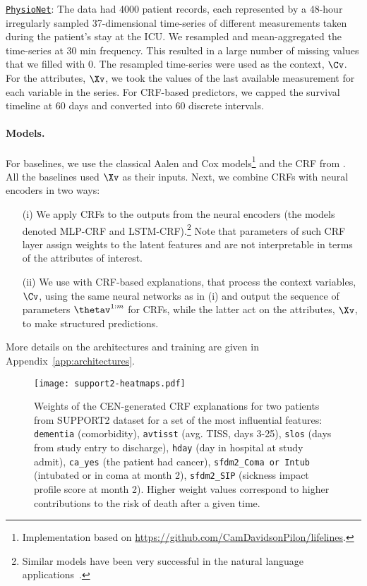 \documentclass[twoside,11pt]{article}
\begin{document}
\underline{\texttt{PhysioNet}}:
The data had 4000 patient records, each represented by a 48-hour irregularly sampled 37-dimensional time-series of different measurements taken during the patient's stay at the ICU.
We resampled and mean-aggregated the time-series at 30 min frequency.
This resulted in a large number of missing values that we filled with 0.
The resampled time-series were used as the context, $\Cv$.
For the attributes, $\Xv$, we took the values of the last available measurement for each variable in the series.
For CRF-based predictors, we capped the survival timeline at 60 days and converted into 60 discrete intervals.

\paragraph{Models.}
For baselines, we use the classical Aalen and Cox models\footnote{Implementation based on \url{https://github.com/CamDavidsonPilon/lifelines}.} and the CRF from \citep{lin2011learning}.
All the baselines used $\Xv$ as their inputs.
Next, we combine CRFs with neural encoders in two ways:
\begin{itemize}[noitemsep,topsep=2pt,parsep=2pt,leftmargin=2em]
    \item[(i)] We apply CRFs to the outputs from the neural encoders (the models denoted MLP-CRF and LSTM-CRF).\footnote{Similar models have been very successful in the natural language applications~\citep{collobert2011natural}.}
    Note that parameters of such CRF layer assign weights to the latent features and are not interpretable in terms of the attributes of interest.
    \item[(ii)] We use {\CENs} with CRF-based explanations, that process the context variables, $\Cv$, using the same neural networks as in (i) and output the sequence of parameters $\thetav^{1:m}$ for CRFs, while the latter act on the attributes, $\Xv$, to make structured predictions.
\end{itemize}
More details on the architectures and training are given in Appendix~\ref{app:architectures}.


\begin{figure}[t]
\centering
\texttt{[image: support2-heatmaps.pdf]}\caption{Weights of the CEN-generated CRF explanations for two patients from SUPPORT2 dataset for a set of the most influential features:
\texttt{dementia} (comorbidity), \texttt{avtisst} (avg. TISS, days 3-25), \texttt{slos} (days from study entry to discharge), \texttt{hday} (day in hospital at study admit), \texttt{ca\_yes} (the patient had cancer), \texttt{sfdm2\_Coma or Intub} (intubated or in coma at month 2), \texttt{sfdm2\_SIP} (sickness impact profile score at month 2).
Higher weight values correspond to higher contributions to the risk of death after a given time.}
\label{fig:support2-heatmaps}
\end{figure}
 
\end{document}
